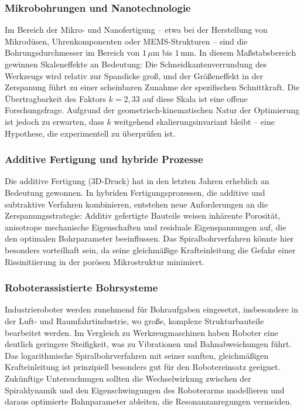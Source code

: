 ﻿\documentclass[12pt,a4paper]{article}
\begin{document}
\subsubsection{Mikrobohrungen und Nanotechnologie}

Im Bereich der Mikro- und Nanofertigung -- etwa bei der Herstellung von Mikrodüsen, Uhrenkomponenten oder MEMS-Strukturen -- sind die Bohrungsdurchmesser im Bereich von $1\,\mu\text{m}$ bis $1\,\text{mm}$. In diesem Maßstabsbereich gewinnen Skaleneffekte an Bedeutung: Die Schneidkantenverrundung des Werkzeugs wird relativ zur Spandicke groß, und der Größeneffekt in der Zerspanung führt zu einer scheinbaren Zunahme der spezifischen Schnittkraft. Die Übertragbarkeit des Faktors $k = 2{,}33$ auf diese Skala ist eine offene Forschungsfrage. Aufgrund der geometrisch-kinematischen Natur der Optimierung ist jedoch zu erwarten, dass $k$ weitgehend skalierungsinvariant bleibt -- eine Hypothese, die experimentell zu überprüfen ist.

\subsubsection{Additive Fertigung und hybride Prozesse}

Die additive Fertigung (3D-Druck) hat in den letzten Jahren erheblich an Bedeutung gewonnen. In hybriden Fertigungsprozessen, die additive und subtraktive Verfahren kombinieren, entstehen neue Anforderungen an die Zerspanungsstrategie: Additiv gefertigte Bauteile weisen inhärente Porosität, anisotrope mechanische Eigenschaften und residuale Eigenspannungen auf, die den optimalen Bohrparameter beeinflussen. Das Spiralbohrverfahren könnte hier besonders vorteilhaft sein, da seine gleichmäßige Krafteinleitung die Gefahr einer Rissinitiierung in der porösen Mikrostruktur minimiert.

\subsubsection{Roboterassistierte Bohrsysteme}

Industrieroboter werden zunehmend für Bohraufgaben eingesetzt, insbesondere in der Luft- und Raumfahrtindustrie, wo große, komplexe Strukturbauteile bearbeitet werden. Im Vergleich zu Werkzeugmaschinen haben Roboter eine deutlich geringere Steifigkeit, was zu Vibrationen und Bahnabweichungen führt. Das logarithmische Spiralbohrverfahren mit seiner sanften, gleichmäßigen Krafteinleitung ist prinzipiell besonders gut für den Robotereinsatz geeignet. Zukünftige Untersuchungen sollten die Wechselwirkung zwischen der Spiraldynamik und den Eigenschwingungen des Roboterarms modellieren und daraus optimierte Bahnparameter ableiten, die Resonanzanregungen vermeiden.
\end{document}
